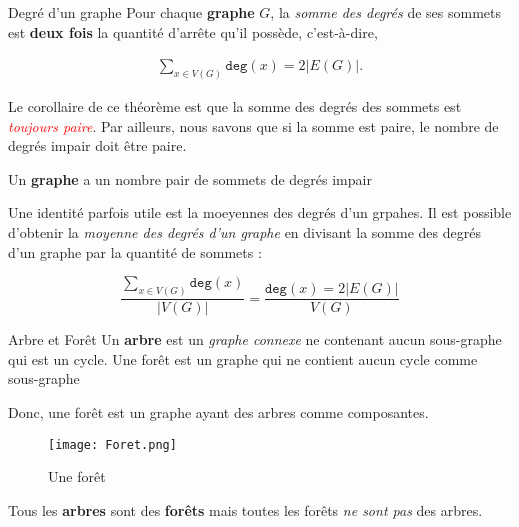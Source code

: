 \documentclass[16pt]{report}
\begin{document}
\begin{multicols*}{2}
            \begin{Theorem}{Degré d'un graphe}
                Pour chaque \textbf{graphe} $G$, la \textit{somme des degrés} de ses sommets est 
                \textbf{deux fois} la quantité d'arrête qu'il possède, c'est-à-dire, 

                \begin{align*}
                        \sum_{x\in V(G)} \texttt{deg}(x) = 2 |E(G)|.
                \end{align*}
            \end{Theorem}                    


            Le corollaire de ce théorème est que la somme des degrés des sommets est 
            \textit{\textcolor{red}{toujours paire}}. Par ailleurs, nous savons que 
            si la somme est paire, le nombre de degrés impair doit être paire.


            \begin{prop}{}{}
                Un \textbf{graphe} a un nombre pair de sommets de degrés impair
            \end{prop}


            Une identité parfois utile est la moeyennes des degrés d'un grpahes. 
            Il est possible d'obtenir la \textit{moyenne des degrés d'un graphe} en divisant 
            la somme des degrés d'un graphe par la quantité de sommets : 

            \[ 
            \dfrac{\sum_{x\in V(G)}\texttt{deg}(x)}{|V(G)|} =  \dfrac{\texttt{deg}(x) = 2 |E(G)|}{V(G)} \]


            \begin{Definitionx}{Arbre et Forêt}{}
                Un \textbf{arbre} est un \textit{graphe connexe} ne contenant aucun sous-graphe qui est 
                un cycle. Une forêt est un graphe qui ne contient aucun cycle comme sous-graphe
            \end{Definitionx}

            Donc, une forêt est un graphe ayant des arbres comme composantes. 
            \begin{figure}[H]
                \begin{center}
                    \texttt{[image: Foret.png]}
                \end{center}
                \caption{Une forêt}
            \end{figure}

            \begin{note}{}{}
                Tous les \textbf{arbres} sont des \textbf{forêts} mais toutes les forêts 
                \textit{ne sont pas} des arbres.   
            \end{note}
            

\end{multicols*}
\end{document}
